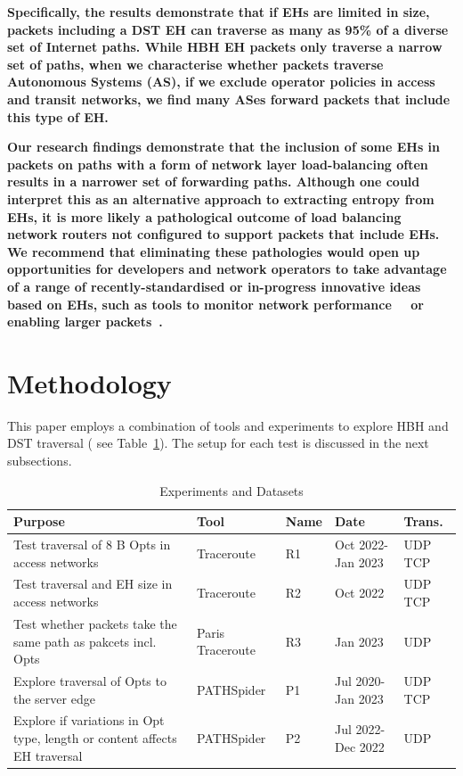 \documentclass[conference]{IEEEtran}
\begin{document}
\textbf{ Specifically, the results demonstrate that if  EHs are limited in size,
packets including a DST EH can traverse as many as
95\% of a diverse set of Internet paths. While HBH EH packets only traverse a narrow set of paths, when we
characterise whether packets traverse Autonomous Systems (AS), if we exclude operator policies in access and transit networks, we find many ASes forward packets that include this type of EH.}

\textbf{ Our research findings
demonstrate that the inclusion of some EHs in packets on paths with a form of network layer load-balancing often results in a narrower set of forwarding paths. Although one could interpret this as an alternative approach to extracting entropy from EHs, it is more likely a
pathological outcome of load balancing network routers not configured to support packets that include EHs.
We recommend that eliminating these pathologies would open up opportunities for
developers and network operators to take advantage of a range of recently-standardised or in-progress innovative ideas based on EHs, such as tools to monitor network performance~\cite{rfc8250}~\cite{ietf-ippm-ioam-ipv6-options-10} or enabling larger packets~\cite{rfc9268}.}

\section{Methodology} 
\label{sec:methodology}

This paper employs a combination of tools and experiments to explore HBH and DST traversal ( see Table~\ref{tbl:datasets}). The setup for each test is discussed in the next subsections.

\begin{table}
\caption{Experiments and Datasets}
\begin{tabular}{p{}|p{}|p{}|p{}|p{}}
Purpose                                                                          & Tool         & Name & Date               & Trans. \\
\hline
\hline
Test traversal of 8 B Opts in access networks                                  & Traceroute       & R1           & Oct 2022- Jan 2023 & UDP TCP          \\
\hline
Test traversal and EH size in access networks                                & Traceroute       & R2           & Oct 2022           & UDP TCP          \\
\hline
Test whether packets take the same path as pakcets incl. Opts & Paris Traceroute & R3           & Jan 2023           & UDP               \\
\hline
Explore traversal of Opts to the server edge                              & PATHSpider       & P1           & Jul 2020- Jan 2023 & UDP TCP          \\
\hline
Explore if variations in Opt type, length or content affects EH traversal   & PATHSpider       & P2           & Jul 2022- Dec 2022     & UDP              
\end{tabular}
  \label{tbl:datasets}
\end{table}
    
\end{document}
